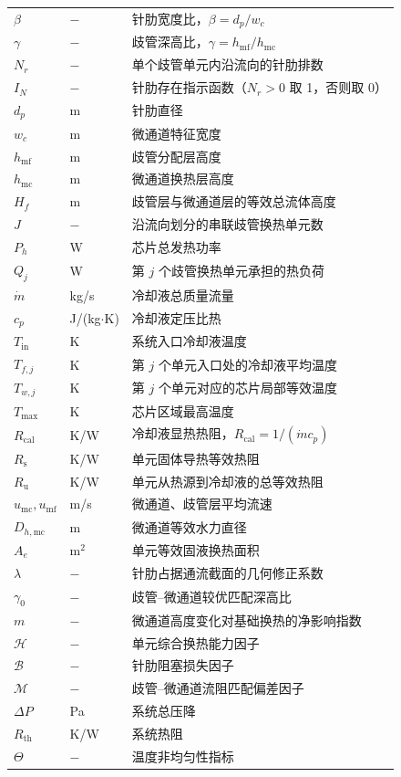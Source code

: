 \documentclass[12pt,a4paper]{ctexart}
\begin{document}
\begin{longtable}{@{}>{\centering\arraybackslash}p{}
                  >{\centering\arraybackslash}p{}
                  p{}@{}}
$\beta$ & $-$ & 针肋宽度比，$\beta=d_p/w_c$\\
$\gamma$ & $-$ & 歧管深高比，$\gamma=h_{\mathrm{mf}}/h_{\mathrm{mc}}$\\
$N_r$ & $-$ & 单个歧管单元内沿流向的针肋排数\\
$I_N$ & $-$ & 针肋存在指示函数（$N_r>0$ 取 1，否则取 0）\\
$d_p$ & m & 针肋直径\\
$w_c$ & m & 微通道特征宽度\\
$h_{\mathrm{mf}}$ & m & 歧管分配层高度\\
$h_{\mathrm{mc}}$ & m & 微通道换热层高度\\
$H_f$ & m & 歧管层与微通道层的等效总流体高度\\
$J$ & $-$ & 沿流向划分的串联歧管换热单元数\\
$P_h$ & W & 芯片总发热功率\\
$Q_j$ & W & 第 $j$ 个歧管换热单元承担的热负荷\\
$\dot m$ & kg/s & 冷却液总质量流量\\
$c_p$ & J/(kg$\cdot$K) & 冷却液定压比热\\
$T_{\mathrm{in}}$ & K & 系统入口冷却液温度\\
$T_{f,j}$ & K & 第 $j$ 个单元入口处的冷却液平均温度\\
$T_{w,j}$ & K & 第 $j$ 个单元对应的芯片局部等效温度\\
$T_{\max}$ & K & 芯片区域最高温度\\
$R_{\mathrm{cal}}$ & K/W & 冷却液显热热阻，$R_{\mathrm{cal}}=1/(\dot m c_p)$\\
$R_{\mathrm{s}}$ & K/W & 单元固体导热等效热阻\\
$R_{\mathrm{u}}$ & K/W & 单元从热源到冷却液的总等效热阻\\
$u_{\mathrm{mc}},u_{\mathrm{mf}}$ & m/s & 微通道、歧管层平均流速\\
$D_{h,\mathrm{mc}}$ & m & 微通道等效水力直径\\
$A_e$ & m$^2$ & 单元等效固液换热面积\\
$\lambda$ & $-$ & 针肋占据通流截面的几何修正系数\\
$\gamma_0$ & $-$ & 歧管--微通道较优匹配深高比\\
$m$ & $-$ & 微通道高度变化对基础换热的净影响指数\\
$\mathcal{H}$ & $-$ & 单元综合换热能力因子\\
$\mathcal{B}$ & $-$ & 针肋阻塞损失因子\\
$\mathcal{M}$ & $-$ & 歧管--微通道流阻匹配偏差因子\\
$\Delta P$ & Pa & 系统总压降\\
$R_{\mathrm{th}}$ & K/W & 系统热阻\\
$\Theta$ & $-$ & 温度非均匀性指标\\
\end{longtable}
\end{document}

